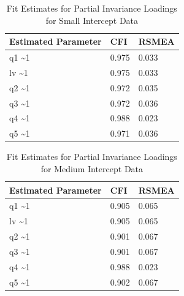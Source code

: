 \documentclass[
  man]{apa7}
\begin{document}
\begin{table}[tbp]

\begin{center}
\begin{threeparttable}

\caption{\label{tab:p-tab15}Fit Estimates for Partial Invariance Loadings for Small Intercept Data}

\begin{tabular}{lll}
\toprule
Estimated Parameter & CFI & RSMEA\\
\midrule
q1 \textasciitilde{}1 & 0.975 & 0.033\\
lv \textasciitilde{}1 & 0.975 & 0.033\\
q2 \textasciitilde{}1 & 0.972 & 0.035\\
q3 \textasciitilde{}1 & 0.972 & 0.036\\
q4 \textasciitilde{}1 & 0.988 & 0.023\\
q5 \textasciitilde{}1 & 0.971 & 0.036\\
\bottomrule
\end{tabular}

\end{threeparttable}
\end{center}

\end{table}

\begin{table}[tbp]

\begin{center}
\begin{threeparttable}

\caption{\label{tab:p-tab16}Fit Estimates for Partial Invariance Loadings for Medium Intercept Data}

\begin{tabular}{lll}
\toprule
Estimated Parameter & CFI & RSMEA\\
\midrule
q1 \textasciitilde{}1 & 0.905 & 0.065\\
lv \textasciitilde{}1 & 0.905 & 0.065\\
q2 \textasciitilde{}1 & 0.901 & 0.067\\
q3 \textasciitilde{}1 & 0.901 & 0.067\\
q4 \textasciitilde{}1 & 0.988 & 0.023\\
q5 \textasciitilde{}1 & 0.902 & 0.067\\
\bottomrule
\end{tabular}

\end{threeparttable}
\end{center}

\end{table}
\end{document}
